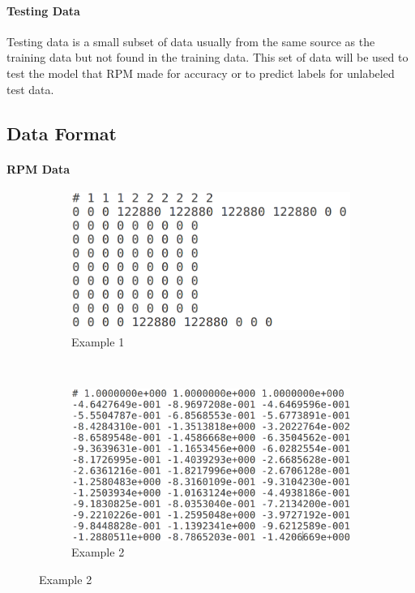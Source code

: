 \documentclass[letterpaper, 12pt]{article}
\begin{document}
\paragraph{Testing Data}
Testing data is a small subset of data usually from the same source as the training data but not found in the training data. This set of data will be used to test the model that RPM made for accuracy or to predict labels for unlabeled test data.

\subsection{Data Format}

\paragraph{RPM Data}

\begin{figure}[h]
  \caption{Examples of RPM Data}
  \label{fig:rpm-data-exs}
  \begin{subfigure}[b]{0.5\textwidth}
    \includegraphics[width=\textwidth]{rpm_data_example_1}
    \caption{Example 1}
    \label{fig:rpm-data-ex-1}
  \end{subfigure}
  ~
  \begin{subfigure}[b]{0.5\textwidth}
    \includegraphics[width=\textwidth]{rpm_data_example_2}
    \caption{Example 2}
    \label{fig:rpm-data-ex-2}
  \end{subfigure}
\end{figure}
\end{document}
